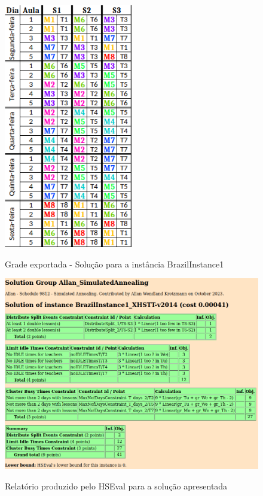 \begin{figure}[h]
	\centering
	\caption{Grade exportada - Solução para a instância BrazilInstance1}
	\includegraphics[width=0.5\textwidth]{./dados/figuras/brazilinstance1}
	\label{fig:brazilinstance1_solucao}
\end{figure}

\begin{figure}[h]
	\centering
	\caption{Relatório produzido pelo HSEval para a solução apresentada}
	\includegraphics[width=1\textwidth]{./dados/figuras/hseval_brazilinstance1}
	\label{fig:hseval_brazilinstance1}
\end{figure}

